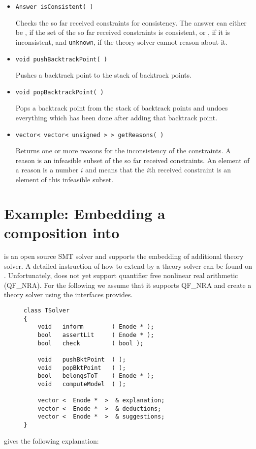 \begin{itemize}
    \item \begin{verbatim}Answer isConsistent( )\end{verbatim}
    	Checks the so far received constraints for consistency. The answer can either be
    	\true, if the set of the so far received constraints is consistent, or 
    	\false, if it is inconsistent, and \texttt{unknown}, if the theory 
    	solver cannot reason about it.
    \item \begin{verbatim}void pushBacktrackPoint( )\end{verbatim}
    	Pushes a backtrack point to the stack of backtrack points.
    \item \begin{verbatim}void popBacktrackPoint( )\end{verbatim}
    	Pops a backtrack point from the stack of backtrack points and undoes everything
		which has been done after adding that backtrack point.
    \item \begin{verbatim}vector< vector< unsigned > > getReasons( )\end{verbatim}
    	Returns one or more reasons for the inconsistency of the constraints. A reason
    	is an infeasible subset of the so far received constraints. An element of a reason
    	is a number $i$ and means that the $i$th received constraint is an element of
    	this infeasible subset.
\end{itemize}

\section{Example: Embedding a \smtrat composition into \opensmt}
\opensmt is an open source SMT solver and supports the embedding of additional
theory solver. A detailed instruction of how to extend \opensmt by a theory solver
can be found on \opensmtURL. Unfortunately, \opensmt does not yet support
quantifier free nonlinear real arithmetic (QF\_NRA). For the following we assume 
that it supports QF\_NRA and create a theory solver using the interfaces
\opensmt provides.

\begin{figure}[htb] 
\begin{verbatim}
class TSolver 
{
    void   inform        ( Enode * ); 
    bool   assertLit     ( Enode * ); 
    bool   check         ( bool ); 

    void   pushBktPoint  ( ); 
    void   popBktPoint   ( ); 
    bool   belongsToT    ( Enode * ); 
    void   computeModel  ( ); 

    vector <  Enode *  >  & explanation; 
    vector <  Enode *  >  & deductions; 
    vector <  Enode *  >  & suggestions; 
}
\end{verbatim}
\end{figure}
\newpage
\noindent\opensmt gives the following explanation:

